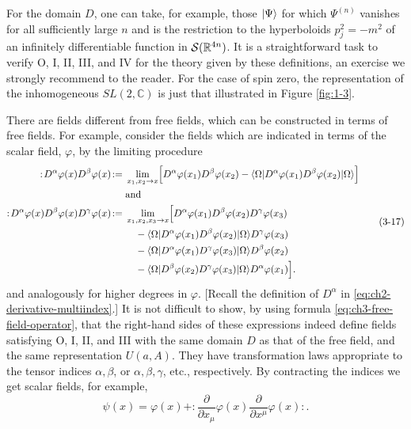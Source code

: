 For the domain $D$, one can take, for example, those $\lvert \Psi\rangle$ for
which $\Psi^{(n)}$ vanishes for all sufficiently large $n$ and is the
restriction to the hyperboloids $p_j^2=-m^2$ of an infinitely differentiable
function in $\mathcal{S}(\mathbb R^{4n})$.  It is a straightforward task to
verify O, I, II, III, and IV for the theory given by these definitions, an
exercise we strongly recommend to the reader.  For the case of spin zero,
the representation of the inhomogeneous $SL(2,\mathbb C)$ is just that
illustrated in Figure \ref{fig:1-3}.

There are fields different from free fields, which can be constructed in
terms of free fields.  For example, consider the fields which are indicated
in terms of the scalar field, $\varphi$, by the limiting procedure
\begin{equation}
\begin{aligned}
  :\!D^\alpha\varphi(x)D^\beta\varphi(x)\!:
  ={ }&\lim_{x_1,x_2\to x}\Bigl[
  D^\alpha\varphi(x_1)D^\beta\varphi(x_2)
  -\langle \Omega\rvert D^\alpha\varphi(x_1)D^\beta\varphi(x_2)\lvert \Omega\rangle\Bigr] \\
  &\text{and} \\
  :\!D^\alpha\varphi(x)D^\beta\varphi(x)D^\gamma\varphi(x)\!:
  ={ }&\lim_{x_1,x_2,x_3\to x}\Bigl[
  D^\alpha\varphi(x_1)D^\beta\varphi(x_2)D^\gamma\varphi(x_3) \\
  &\quad-\langle \Omega\rvert D^\alpha\varphi(x_1)D^\beta\varphi(x_2)\lvert \Omega\rangle
  D^\gamma\varphi(x_3) \\
  &\quad-\langle \Omega\rvert D^\alpha\varphi(x_1)D^\gamma\varphi(x_3)\lvert \Omega\rangle
  D^\beta\varphi(x_2) \\
  &\quad-\langle \Omega\rvert D^\beta\varphi(x_2)D^\gamma\varphi(x_3)\lvert \Omega\rangle
  D^\alpha\varphi(x_1)\Bigr].
\end{aligned}
\tag{3-17}\label{eq:ch3-wick-polynomials}
\end{equation}
and analogously for higher degrees in $\varphi$.  [Recall the definition of
$D^\alpha$ in \eqref{eq:ch2-derivative-multiindex}.]  It is not difficult to show, by using formula
\eqref{eq:ch3-free-field-operator}, that the right-hand sides of these expressions indeed define fields
satisfying O, I, II, and III with the same domain $D$ as that of the free
field, and the same representation $U(a,A)$.  They have transformation laws
appropriate to the tensor indices $\alpha,\beta$, or $\alpha,\beta,\gamma$,
etc., respectively.  By contracting the indices we get scalar fields, for
example,
\begin{equation}
  \psi(x)=\varphi(x)+:
  \frac{\partial}{\partial x_\mu}\varphi(x)
  \frac{\partial}{\partial x^\mu}\varphi(x): .
  \tag{3-18}\label{eq:ch3-wick-scalar-example}
\end{equation}

